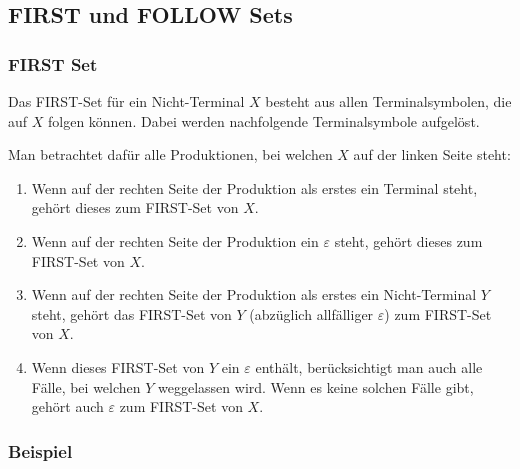 \subsection{FIRST und FOLLOW Sets}

\subsubsection{FIRST Set}

Das FIRST-Set für ein Nicht-Terminal $X$ besteht aus allen Terminalsymbolen, die auf $X$ folgen können.
Dabei werden nachfolgende Terminalsymbole aufgelöst.

Man betrachtet dafür alle Produktionen, bei welchen $X$ auf der linken Seite steht:

\begin{enumerate}
	\item Wenn auf der rechten Seite der Produktion als erstes ein Terminal steht, gehört dieses
		zum FIRST-Set von $X$.
	\item Wenn auf der rechten Seite der Produktion ein $\varepsilon$ steht, gehört dieses zum
		FIRST-Set von $X$.
	\item Wenn auf der rechten Seite der Produktion als erstes ein Nicht-Terminal $Y$ steht, gehört
		das FIRST-Set von $Y$ (abzüglich allfälliger $\varepsilon$) zum FIRST-Set von $X$.
	\item Wenn dieses FIRST-Set von $Y$ ein $\varepsilon$ enthält, berücksichtigt man auch alle Fälle,
		bei welchen $Y$ weggelassen wird. Wenn es keine solchen Fälle gibt, gehört auch
		$\varepsilon$ zum FIRST-Set von $X$.
\end{enumerate}

\subsubsection*{Beispiel}

